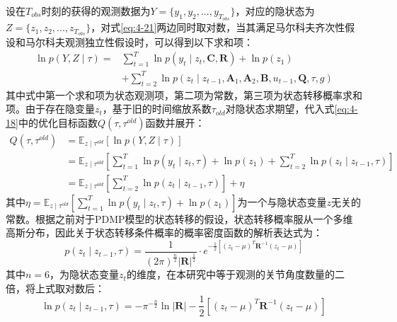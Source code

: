 设在$T_{obs}$时刻的获得的观测数据为$Y=\{y_1,y_2,...,y_{T_{obs}}\}$，对应的隐状态为$Z = \{z_1,z_2,...,z_{T_{obs}}\}$，对式\ref{eq:4-21}两边同时取对数，当其满足马尔科夫齐次性假设和马尔科夫观测独立性假设时，可以得到以下求和项：
\begin{equation}
    \begin{aligned}
    \ln p(Y, Z \mid \tau)= & \sum_{t=1}^T \ln p\left(y_t \mid z_t, \mathbf{C}, \mathbf{R}\right)+\ln p\left(z_1\right) \\
    & +\sum_{t=2}^T \ln p\left(z_t \mid z_{t-1}, \mathbf{A}_1, \mathbf{A}_2, \mathbf{B}, u_{t-1}, \mathbf{Q}, \tau, g\right)
    \end{aligned}
    \label{eq:4-20}
\end{equation}
其中式中第一个求和项为状态观测项，第二项为常数，第三项为状态转移概率求和项。由于存在隐变量$z_t$，基于旧的时间缩放系数$\tau_{old}$对隐状态求期望，代入式\ref{eq:4-18}中的优化目标函数$ Q\left(\tau, \tau^{old}\right)$函数并展开：
\begin{equation}
\begin{aligned}
    Q\left(\tau, \tau^{old}\right)
    &=\mathbb{E}_{z \mid \tau^{old}}\left[\ln p(Y, Z \mid \tau)\right]\\
    & =\mathbb{E}_{z \mid \tau^{old}}\left[\sum_{t=1}^T \ln p\left(y_t \mid z_t, \tau\right)+\ln p\left(z_1\right)+\sum_{t=2}^T \ln p\left(z_t \mid z_{t-1}, \tau\right)\right] \\
    & =\mathbb{E}_{z \mid \tau^{old}}\left[\sum_{t=2}^T \ln p\left(z_t \mid z_{t-1}, \tau\right)\right] + \eta 
\end{aligned}
\label{eq:4-21}
\end{equation}
其中$\eta=\mathbb{E}_{z \mid \tau^{old}} \left[\sum_{t=1}^T \ln p\left(y_t \mid z_t, \tau\right) + \ln p\left(z_1\right)\right]$为一个与隐状态变量$z$无关的常数。根据之前对于PDMP模型的状态转移的假设，状态转移概率服从一个多维高斯分布，因此关于状态转移条件概率的概率密度函数的解析表达式为：
\begin{equation}
    p\left(z_t \mid z_{t-1}, \tau\right)=\frac{1}{(2 \pi)^{\frac{n}{2}}|\mathbf{R}|^{\frac{1}{2}}} \cdot e^{-\frac{1}{2}\left[\left(z_t-\mu\right)^T \mathbf{R}^{-1}\left(z_t-\mu\right)\right]}
    \label{eq:4-22}
\end{equation}
其中$n=6$，为隐状态变量$z_t$的维度，在本研究中等于观测的关节角度数量的二倍，将上式取对数后：
\begin{equation}
    \ln p\left(z_t \mid z_{t-1}, \tau\right)=-\pi^{-\frac{n}{2}}\ln\mathbf{|R|}-\frac{1}{2}\left[\left(z_t-\mu\right)^T \mathbf{R}^{-1}\left(z_t-\mu\right)\right]
    \label{eq:4-23}
\end{equation}
